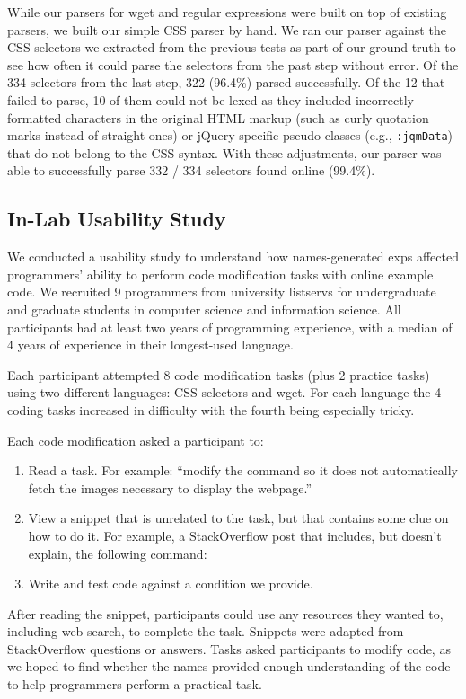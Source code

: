 \begin{changes}
While our parsers for wget and regular expressions were built on top of existing parsers, we built our simple CSS parser by hand.
We ran our parser against the CSS selectors we extracted from the previous tests as part of our ground truth to see how often it could parse the selectors from the past step without error.
Of the 334 selectors from the last step, 322 (96.4\%) parsed successfully.
Of the 12 that failed to parse, 10 of them could not be lexed as they included incorrectly-formatted characters in the original HTML markup (such as curly quotation marks instead of straight ones) or jQuery-specific pseudo-classes (e.g., \texttt{:jqmData}) that do not belong to the CSS syntax.
With these adjustments, our parser was able to successfully parse 332 / 334 selectors found online (99.4\%).

\end{changes}

\subsection{In-Lab Usability Study}

We conducted a usability study to understand how \glspl{name}-generated \glspl{exp} affected programmers' ability to perform code modification tasks with online example code.
We recruited 9 programmers from university listservs for undergraduate and graduate students in computer science and information science.
All participants had at least two years of programming experience, with a median of 4 years of experience in their longest-used language.

Each participant attempted 8 code modification tasks (plus 2 practice tasks) using two different languages: CSS selectors and wget.
For each language the 4 coding tasks increased in difficulty with the fourth being especially tricky.

\begin{changes}
Each code modification asked a participant to:
\begin{enumerate}
\item Read a task.  For example: ``modify the command so it does not automatically fetch the images necessary to display the webpage.''
\item View a snippet that is unrelated to the task, but that contains some clue on how to do it.  For example, a StackOverflow post that includes, but doesn't explain, the following command:
\item Write and test code against a condition we provide.
\end{enumerate}

After reading the snippet, participants could use any resources they wanted to, including web search, to complete the task.
Snippets were adapted from StackOverflow questions or answers.
Tasks asked participants to modify code, as we hoped to find whether the \glspl{name} provided enough understanding of the code to help programmers perform a practical task.
\end{changes}


